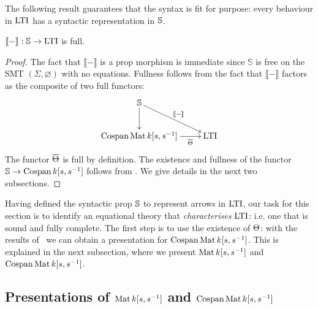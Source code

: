 The following result guarantees that the syntax is fit for purpose: every
behaviour in $\operatorname{\mathrm{LTI}}$ has a syntactic representation in $\mathbb{S}$.
\begin{proposition}\label{prop.syntaxfull}
  $\llbracket - \rrbracket: \mathbb{S}\to\operatorname{\mathrm{LTI}}$ is full.
\end{proposition}
\begin{proof}
  The fact that $\llbracket - \rrbracket$ is a prop morphism is immediate since
  $\mathbb{S}$ is free on the SMT $(\Sigma,\varnothing)$ with no
  equations.  Fullness follows from the fact that $\llbracket - \rrbracket$
  factors as the composite of two full functors:
  \[
    \xymatrixrowsep{2pc}
    \xymatrix{
      \syntax \ar[d] \ar[dr]^{\llbracket-\rrbracket} \\
      \cospan\mat\pk \ar[r]_-{\cospanfunrest} & \ltids
    }
  \]
  The functor $\overline{\Theta}$ is full by definition. The existence and fullness
  of the functor $\mathbb{S}\to\operatorname{{Cospan}}{k[s,s^{-1}]}$ follows from \cite[Theorem 3.41]{Za}. We
  give details in the next two subsections.
\end{proof}

Having defined the syntactic prop $\mathbb{S}$ to represent arrows in $\operatorname{\mathrm{LTI}}$, our
task for this section is to identify an equational theory that
\emph{characterises} $\operatorname{\mathrm{LTI}}$: i.e. one that is sound and fully complete. The
first step is to use the existence of $\Theta$: with the results
of~\cite{BSZ2,Za} we can obtain a presentation for $\operatorname{{Cospan}}\operatorname{\mathrm{Mat}}{k[s,s^{-1}]}$. This is
explained in the next subsection, where we present $\operatorname{\mathrm{Mat}}{k[s,s^{-1}]}$ and
$\operatorname{{Cospan}}\operatorname{\mathrm{Mat}}{k[s,s^{-1}]}$. 


\subsection{Presentations of $\operatorname{\mathrm{Mat}}{k[s,s^{-1}]}$ and $\operatorname{{Cospan}}\operatorname{\mathrm{Mat}}{k[s,s^{-1}]}$}\label{subsec:eqhopf}


